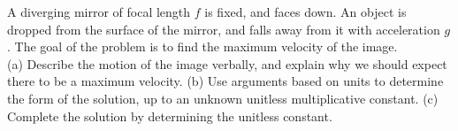 A diverging mirror of focal length $f$ is fixed, and faces down.
An object is dropped from the surface of the mirror, and falls away
from it with acceleration $g$. The goal of the problem is to find
the maximum velocity of the image.\\
(a) Describe the motion of the image verbally, and explain why we should
expect there to be a maximum velocity.\hwendpart
(b) Use arguments based on units to determine the form of the solution,
up to an unknown unitless multiplicative constant.\hwendpart
(c) Complete the solution by determining the unitless constant.\answercheck

